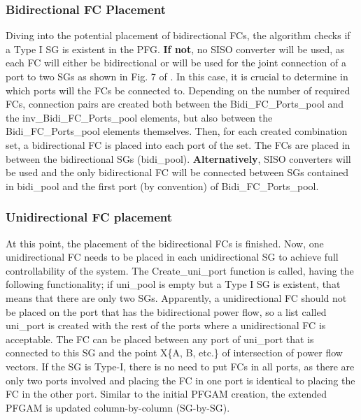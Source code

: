 \documentclass[conference]{IEEEtran}
\begin{document}
\subsubsection{Bidirectional FC Placement}
Diving into the potential placement of bidirectional FCs, the algorithm checks if a Type I SG is existent in the PFG. \textbf{If not}, no SISO converter will be used, as each FC will either be bidirectional or will be used for the joint connection of a port to two SGs as shown in Fig. 7 of \cite{aljarajreh_synthesis_2021}. In this case, it is crucial to determine in which ports will the FCs be connected to. Depending on the number of required FCs, connection pairs are created both between the Bidi\_FC\_Ports\_pool and the inv\_Bidi\_FC\_Ports\_pool elements, but also between the Bidi\_FC\_Ports\_pool elements themselves. Then, for each created combination set, a bidirectional FC is placed into each port of the set. The FCs are placed in between the bidirectional SGs (bidi\_pool). \textbf{Alternatively}, SISO converters will be used and the only bidirectional FC will be connected between SGs contained in bidi\_pool and the first port (by convention) of Bidi\_FC\_Ports\_pool. 
\subsubsection{Unidirectional FC placement}
At this point, the placement of the bidirectional FCs is finished. Now, one unidirectional FC needs to be placed in each unidirectional SG to achieve full controllability of the system. The Create\_uni\_port function is called, having the following functionality; if uni\_pool is empty but a Type I SG is existent, that means that there are only two SGs. Apparently, a unidirectional FC should not be placed on the port that has the bidirectional power flow, so a list called uni\_port is created with the rest of the ports where a unidirectional FC is acceptable. The FC can be placed between any port of uni\_port that is connected to this SG and the point X\{A, B, etc.\} of intersection of power flow vectors. If the SG is Type-I, there is no need to put FCs in all ports, as there are only two ports involved and placing the FC in one port is identical to placing the FC in the other port. Similar to the initial PFGAM creation, the extended PFGAM is updated column-by-column (SG-by-SG).
\end{document}

